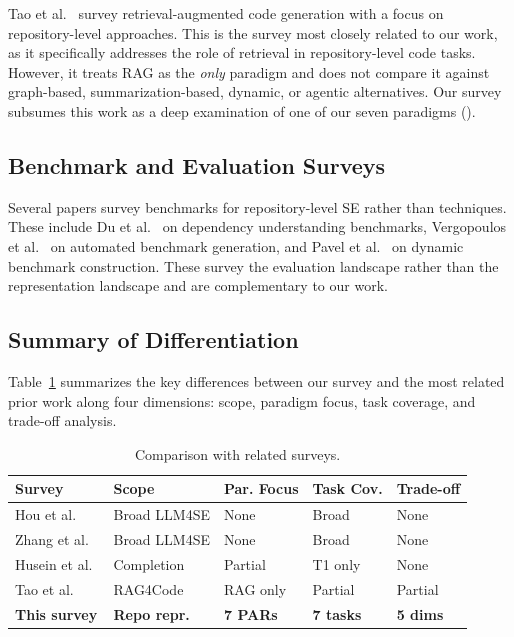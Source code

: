 Tao et al.~\cite{tao2026ragsurvey} survey retrieval-augmented code generation with a focus
on repository-level approaches. This is the survey most closely related to our work, as it
specifically addresses the role of retrieval in repository-level code tasks. However, it treats
RAG as the \emph{only} paradigm and does not compare it against graph-based, summarization-based,
dynamic, or agentic alternatives. Our survey subsumes this work as a deep examination of one
of our seven paradigms ().

\subsection{Benchmark and Evaluation Surveys}

Several papers survey benchmarks for repository-level SE rather than techniques. These include
Du et al.~\cite{du2025dependeval} on dependency understanding benchmarks, Vergopoulos et
al.~\cite{vergopoulos2025automated} on automated benchmark generation, and
Pavel et al.~\cite{pavel2025swemera} on dynamic benchmark construction. These survey the
evaluation landscape rather than the representation landscape and are complementary to our work.

\subsection{Summary of Differentiation}

Table~\ref{tab:related-surveys} summarizes the key differences between our survey and the
most related prior work along four dimensions: scope, paradigm focus, task coverage, and
trade-off analysis.

\begin{table}[h]
\caption{Comparison with related surveys.}
\label{tab:related-surveys}
\small
\begin{tabular}{lp{2cm}p{1.5cm}p{1.5cm}p{1.5cm}}
\toprule
\textbf{Survey} & \textbf{Scope} & \textbf{Par. Focus} & \textbf{Task Cov.} & \textbf{Trade-off} \\
\midrule
Hou et al.~\cite{hou2024llmse}           & Broad LLM4SE & None & Broad & None \\
Zhang et al.~\cite{zhang2026survey}       & Broad LLM4SE & None & Broad & None \\
Husein et al.~\cite{husein2025codecompletion} & Completion & Partial & T1 only & None \\
Tao et al.~\cite{tao2026ragsurvey}       & RAG4Code & RAG only & Partial & Partial \\
\textbf{This survey}                      & \textbf{Repo repr.} & \textbf{7 PARs} & \textbf{7 tasks} & \textbf{5 dims} \\
\bottomrule
\end{tabular}
\end{table}

